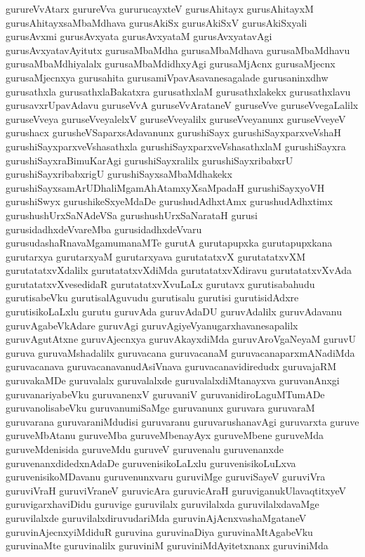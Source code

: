 {gurureVvAtarx
gurureVva
gururucayxteV
gurusAhitayx
gurusAhitayxM
gurusAhitayxsaMbaMdhava
gurusAkiSx
gurusAkiSxV
gurusAkiSxyali
gurusAvxmi
gurusAvxyata
gurusAvxyataM
gurusAvxyatavAgi
gurusAvxyatavAyitutx
gurusaMbaMdha
gurusaMbaMdhava
gurusaMbaMdhavu
gurusaMbaMdhiyalalx
gurusaMbaMdidhxyAgi
gurusaMjAcnx
gurusaMjecnx
gurusaMjecnxya
gurusahita
gurusamiVpavAsavanesagalade
gurusaninxdhw
gurusathxla
gurusathxlaBakatxra
gurusathxlaM
gurusathxlakekx
gurusathxlavu
gurusavxrUpavAdavu
guruseVvA
guruseVvArataneV
guruseVve
guruseVvegaLalilx
guruseVveya
guruseVveyalelxV
guruseVveyalilx
guruseVveyanunx
guruseVveyeV
gurushacx
gurusheVSaparxsAdavanunx
gurushiSayx
gurushiSayxparxveVshaH
gurushiSayxparxveVshasathxla
gurushiSayxparxveVshasathxlaM
gurushiSayxra
gurushiSayxraBimuKarAgi
gurushiSayxralilx
gurushiSayxribabxrU
gurushiSayxribabxrigU
gurushiSayxsaMbaMdhakekx
gurushiSayxsamArUDhaliMgamAhAtamxyXsaMpadaH
gurushiSayxyoVH
gurushiSwyx
gurushikeSxyeMdaDe
gurushudAdhxtAmx
gurushudAdhxtimx
gurushushUrxSaNAdeVSa
gurushushUrxSaNarataH
gurusi
gurusidadhxdeVvareMba
gurusidadhxdeVvaru
gurusudashaRnavaMgamumanaMTe
gurutA
gurutapupxka
gurutapupxkana
gurutarxya
gurutarxyaM
gurutarxyava
gurutatatxvX
gurutatatxvXM
gurutatatxvXdalilx
gurutatatxvXdiMda
gurutatatxvXdiravu
gurutatatxvXvAda
gurutatatxvXvesedidaR
gurutatatxvXvuLaLx
gurutavx
gurutisabahudu
gurutisabeVku
gurutisalAguvudu
gurutisalu
gurutisi
gurutisidAdxre
gurutisikoLaLxlu
gurutu
guruvAda
guruvAdaDU
guruvAdalilx
guruvAdavanu
guruvAgabeVkAdare
guruvAgi
guruvAgiyeVyanugarxhavanesapalilx
guruvAgutAtxne
guruvAjecnxya
guruvAkayxdiMda
guruvAroVgaNeyaM
guruvU
guruva
guruvaMshadalilx
guruvacana
guruvacanaM
guruvacanaparxmANadiMda
guruvacanava
guruvacanavanudAsiVnava
guruvacanavidiredudx
guruvajaRM
guruvakaMDe
guruvalalx
guruvalalxde
guruvalalxdiMtanayxva
guruvanAnxgi
guruvanariyabeVku
guruvanenxV
guruvaniV
guruvanidiroLaguMTumADe
guruvanolisabeVku
guruvanumiSaMge
guruvanunx
guruvara
guruvaraM
guruvarana
guruvaraniMdudisi
guruvaranu
guruvarushanavAgi
guruvarxta
guruve
guruveMbAtanu
guruveMba
guruveMbenayAyx
guruveMbene
guruveMda
guruveMdenisida
guruveMdu
guruveV
guruvenalu
guruvenanxde
guruvenanxdidedxnAdaDe
guruvenisikoLaLxlu
guruvenisikoLuLxva
guruvenisikoMDavanu
guruvenunxvaru
guruviMge
guruviSayeV
guruviVra
guruviVraH
guruviVraneV
guruvicAra
guruvicAraH
guruviganukUlavaqtitxyeV
guruvigarxhaviDidu
guruvige
guruvilalx
guruvilalxda
guruvilalxdavaMge
guruvilalxde
guruvilalxdiruvudariMda
guruvinAjAcnxvashaMgataneV
guruvinAjecnxyiMdiduR
guruvina
guruvinaDiya
guruvinaMtAgabeVku
guruvinaMte
guruvinalilx
guruviniM
guruviniMdAyitetxnanx
guruviniMda
}
